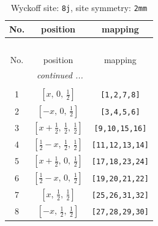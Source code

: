 \documentclass[fleqn,8pt]{jsarticle}
\begin{document}
\begin{longtable}{ccc}
\caption{Wyckoff site: {\tt 8j}, site symmetry: {\tt 2mm}}
 \\
 \hline \hline
No. & position & mapping \\ \hline \endfirsthead

\multicolumn{2}{l}{\tablename\ \thetable{}} \\
 \hline \hline
No. & position & mapping \\ \hline \endhead

 \hline \hline
\multicolumn{2}{r}{\footnotesize\it continued ...} \\ \endfoot

 \hline \hline
\multicolumn{2}{r}{} \\ \endlastfoot

1 & $\left[ x,\, 0,\, \frac{1}{2} \right]$ & {\tt [1,2,7,8]} \\ \hline
2 & $\left[ - x,\, 0,\, \frac{1}{2} \right]$ & {\tt [3,4,5,6]} \\ \hline
3 & $\left[ x + \frac{1}{2},\, \frac{1}{2},\, \frac{1}{2} \right]$ & {\tt [9,10,15,16]} \\ \hline
4 & $\left[ \frac{1}{2} - x,\, \frac{1}{2},\, \frac{1}{2} \right]$ & {\tt [11,12,13,14]} \\ \hline
5 & $\left[ x + \frac{1}{2},\, 0,\, \frac{1}{2} \right]$ & {\tt [17,18,23,24]} \\ \hline
6 & $\left[ \frac{1}{2} - x,\, 0,\, \frac{1}{2} \right]$ & {\tt [19,20,21,22]} \\ \hline
7 & $\left[ x,\, \frac{1}{2},\, \frac{1}{2} \right]$ & {\tt [25,26,31,32]} \\ \hline
8 & $\left[ - x,\, \frac{1}{2},\, \frac{1}{2} \right]$ & {\tt [27,28,29,30]} \\
\end{longtable}
\renewcommand{\arraystretch}{1.2}
\end{document}
